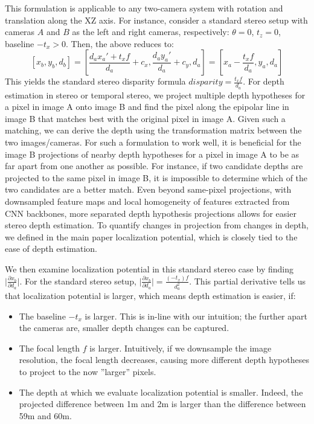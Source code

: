 \documentclass[runningheads, hyperfootnotes=false]{article}
\begin{document}
This formulation is applicable to any two-camera system with rotation and translation along the XZ axis. For instance, consider a standard stereo setup with cameras $A$ and $B$ as the left and right cameras, respectively: $\theta = 0$, $t_z = 0$, baseline $-t_x > 0$. Then, the above reduces to:
\[
[x_b, y_b, d_b] = \left[\frac{d_a x_a' + t_x f}{d_a} + c_x, \frac{d_a y_a'}{d_a} + c_y, d_a\right] = \left[x_a - \frac{t_x f}{d_a}, y_a, d_a \right]
\]
This yields the standard stereo disparity formula $disparity = \frac{t_x f}{d_a}$. For depth estimation in stereo or temporal stereo, we project multiple depth hypotheses for a pixel in image A onto image B and find the pixel along the epipolar line in image B that matches best with the original pixel in image A. Given such a matching, we can derive the depth using the transformation matrix between the two images/cameras. For such a formulation to work well, it is beneficial for the image B projections of nearby depth hypotheses for a pixel in image A to be as far apart from one another as possible. For instance, if two candidate depths are projected to the same pixel in image B, it is impossible to determine which of the two candidates are a better match. Even beyond same-pixel projections, with downsampled feature maps and local homogeneity of features extracted from CNN backbones, more separated depth hypothesis projections allows for easier stereo depth estimation. To quantify changes in projection from changes in depth, we defined in the main paper localization potential, which is closely tied to the ease of depth estimation.

We then examine localization potential in this standard stereo case by finding $\lvert \frac{\partial x_b}{\partial d_a} \rvert$. For the standard stereo setup, $\lvert \frac{\partial x_b}{\partial d_a} \rvert = \frac{(-t_x) f}{d_a^2}$. This partial derivative tells us that localization potential is larger, which means depth estimation is easier, if:
\begin{itemize}
    \item The baseline $-t_x$ is larger. This is in-line with our intuition; the further apart the cameras are, smaller depth changes can be captured. 
    \item The focal length $f$ is larger. Intuitively, if we downsample the image resolution, the focal length decreases, causing more different depth hypotheses to project to the now ''larger'' pixels.
    \item The depth at which we evaluate localization potential is smaller. Indeed, the projected difference between 1m and 2m is larger than the difference between 59m and 60m.
\end{itemize}
\end{document}
